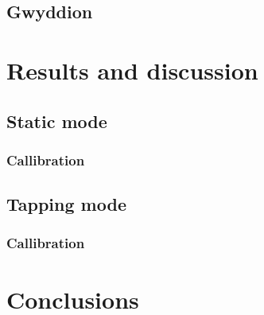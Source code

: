 \documentclass[11pt,a4paper]{article}
\begin{document}
\subsection{Gwyddion}


\section{Results and discussion}

\subsection{Static mode}

\subsubsection{Callibration}

\subsection{Tapping mode}

\subsubsection{Callibration}


\section{Conclusions}


\nocite{*}
\newpage


\end{document}
